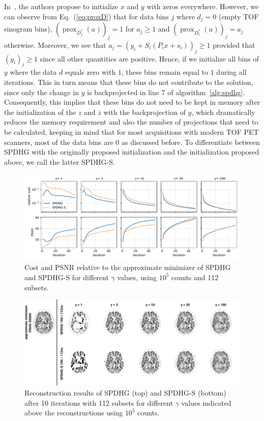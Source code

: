 \documentclass[11pt,twocolumn,twoside]{article}
\DeclareMathOperator{\prox}{prox}
\begin{document}
In~\cite{Ehrhardt2019}, the authors propose to initialize $x$ and $y$ with zeros everywhere.
However, we can observe from Eq.~(\ref{eq:proxD}) that for data bins $j$ where $d_j = 0$ 
(empty TOF sinogram bins), 
$(\prox_{D_j^*}(a))_j = 1$ for $a_j \geq 1$ and $(\prox_{D_i^*}(a))_j = a_j$ otherwise. 
Moreover, we see that $ a_j = (y_i + S_i (P_i x + s_i) )_j \geq 1$ provided that $(y_i)_j \geq 1$ 
since all other quantities are positive. 
Hence, if we initialize all bins of $y$ where the data $d$ equals zero with $1$, 
these bins remain equal to $1$ during all iterations. 
This in turn means that these bins do not contribute to the solution, since only the change
in $y$ is backprojected in line 7 of algorithm~\ref{alg:spdhg}.
Consequently, this implies that these bins do not need to be kept in memory after the initialization
of the $z$ and $\bar{z}$ with the backprojection of $y$, which dramatically reduces the memory
requirement and also the number of projections that need to be calculated, keeping in mind that
for most acquisitions with modern TOF PET scanners, most of the data bins are 0 as discussed before.
To differentiate between SPDHG with the originally proposed initialization and the initialization proposed
above, we call the latter SPDHG-S.

\begin{figure}
  \centering
  \includegraphics[width=1.0\textwidth]{./figs/fig1_brain2d_counts_1_0E+05_beta_6_0E-01_niter_5000_50_nsub_112_metrics.pdf}
  \caption{Cost and PSNR relative to the approximate minimizer of SPDHG and SPDHG-S for different
           $\gamma$ values, using $10^5$ counts and 112 subsets.}
  \label{fig:metrics}
\end{figure}

\begin{figure}
  \centering
  \includegraphics[width=1.0\textwidth]{./figs/fig2_recons_10_iterations.png}
  \caption{Reconstruction results of SPDHG (top) and SPDHG-S (bottom) after 10 iterations with
           112 subsets for different $\gamma$ values indicated above the reconstructions 
           using $10^5$ counts.}
  \label{fig:gamma}
\end{figure}
\end{document}
